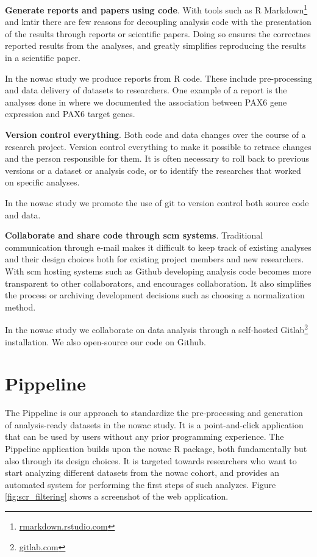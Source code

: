 \textbf{Generate reports and papers using code}. With tools such as R
Markdown\footnote{\url{rmarkdown.rstudio.com}}
and kntir there are few reasons for decoupling analysis code with the
presentation of the results through reports or scientific papers. Doing so
ensures the correctnes reported results from the analyses, and greatly
simplifies reproducing the results in a scientific paper. 

In the \gls{nowac} study we produce reports from R code. These include
pre-processing and data delivery of datasets to researchers. One example of a
report is the analyses done in \cite{kiselev2018transcription} where we
documented the association between PAX6 gene expression and PAX6 target genes.

\textbf{Version control everything}. Both code and data changes over the course
of a research project. Version control everything to make it possible to retrace
changes and the person responsible for them. It is often necessary to roll back
to previous versions or a dataset or analysis code, or to identify the
researches that worked on specific analyses. 

In the \gls{nowac} study we promote the use of git to version control both
source code and data. 

\textbf{Collaborate and share code through \gls{scm} systems}. Traditional
communication through e-mail makes it difficult to keep track of existing
analyses and their design choices both for existing project members and new
researchers. With \gls{scm} hosting systems such as Github developing
analysis code becomes more transparent to other collaborators, and encourages
collaboration. It also simplifies the process or archiving development decisions
such as choosing a normalization method.

In the \gls{nowac} study we collaborate on data analysis through a self-hosted
Gitlab\footnote{\url{gitlab.com}} installation. We also open-source our code on
Github. 



\section{Pippeline}
The Pippeline is our approach to standardize the pre-processing and generation
of analysis-ready datasets in the \gls{nowac} study. It is a point-and-click
application that can be used by users without any prior programming experience.
The Pippeline application builds upon the \gls{nowac} R package, both
fundamentally but also through its design choices. It is targeted towards
researchers who want to start analyzing different datasets from the \gls{nowac}
cohort, and provides an automated system for performing the first steps of such
analyzes. 
Figure \ref{fig:scr_filtering} shows a screenshot of the web application.

